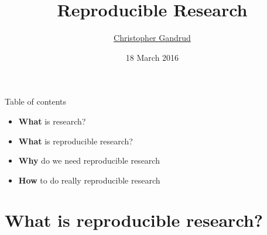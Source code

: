 \documentclass[10pt]{beamer}
\title{Reproducible Research}
\subtitle{}
\date{18 March 2016}
\author{
    \href{mailto:christopher.gandrud@city.ac.uk}{Christopher Gandrud}
}
\institute{SG1022, City University London}
\begin{document}
\maketitle

\begin{frame}{Table of contents}

    \begin{itemize}
        \item \textbf{What} is research?

        \item \textbf{What} is reproducible research?

        \item \textbf{Why} do we need reproducible research

        \item \textbf{How} to do really reproducible research
    \end{itemize}

\end{frame}

\section{What is reproducible research?}
\end{document}
